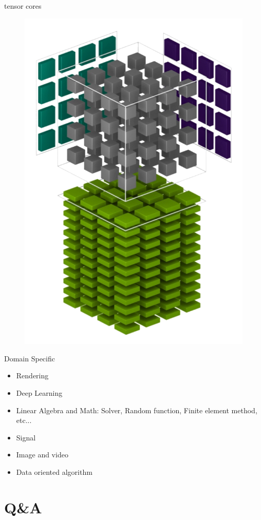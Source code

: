 \documentclass{beamer}
\begin{document}
\begin{frame}{tensor cores}
	\begin{figure}
		\includegraphics[scale=0.25]{figures/tensor.png}
	\end{figure}
\end{frame}

\begin{frame}{Domain Specific}
	\begin{itemize}
		\item Rendering
		\item Deep Learning
		\item Linear Algebra and Math: Solver, Random function, Finite element method, etc...
		\item Signal
		\item Image and video
		\item Data oriented algorithm
	\end{itemize}
\end{frame}

\section{Q\&A}
\end{document}
